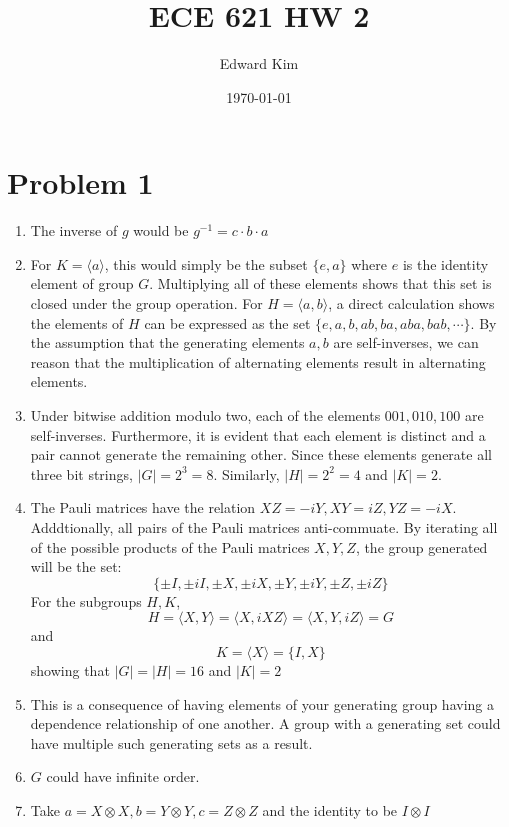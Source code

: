 \documentclass[12pt]{article}%
\begin{document}
\title{ECE 621 HW 2}
\author{Edward Kim}
\date{\today}
\maketitle

\section*{Problem 1}
\begin{enumerate}
	\item The inverse of $g$ would be $g^{-1} = c \cdot b \cdot a$
	\item For $K = \langle a \rangle$, this would simply be the subset $\{e, a \}$ where $e$ is the identity element of group $G$. Multiplying all of these elements shows that this set is closed under the group operation. For $H = \langle a, b \rangle $, a direct calculation shows the elements of $H$ can be expressed as the set \( \{e, a ,b , ab, ba, aba, bab, \cdots \} \). By the assumption that the generating elements $a,b$ are self-inverses, we can reason that the multiplication of alternating elements result in alternating elements.
	\item Under bitwise addition modulo two, each of the elements $001, 010, 100$ are self-inverses. Furthermore, it is evident that each element is distinct and a pair cannot generate the remaining other. Since these elements generate all three bit strings, $|G| = 2^3 = 8$. Similarly, $|H| = 2^2 = 4$ and $|K| = 2$.
	\item The Pauli matrices have the relation $XZ = -iY, XY = iZ, YZ = -iX$. Adddtionally, all pairs of the Pauli matrices anti-commuate. By iterating all of the possible products of the Pauli matrices $X,Y,Z$, the group generated will be the set:
	\[ \{ \pm I,\pm iI, \pm X, \pm iX, \pm Y, \pm iY, \pm Z, \pm iZ \} \]	
For the subgroups $H,K$, \[ H = \langle X, Y \rangle = \langle X, iXZ \rangle  = \langle X, Y, iZ \rangle =  G\] 
and \[ K = \langle X \rangle = \{ I, X \} \]
showing that $|G| = |H| = 16$ and \(|K| = 2\) 
\item This is a consequence of having elements of your generating group having a dependence relationship of one another. A group with a generating set could have multiple such generating sets as a result.
\item $G$ could have infinite order.
\item Take \(a = X \otimes X, b = Y \otimes Y, c = Z \otimes Z\) and the identity to be \(I \otimes I\)  
\end{enumerate}
\end{document}
